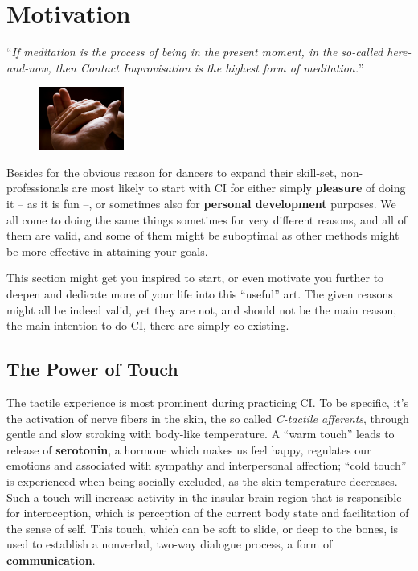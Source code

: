 \chapter{Motivation}\label{ch:motivation}

\begin{displayquote}
    ``\textit{If meditation is the process of being in the present moment, in the so-called here-and-now, then Contact Improvisation is the highest form of meditation.}''
\end{displayquote}

\begin{figure}
    \centering
    \includegraphics[width=0.25\textwidth]{images/motivation}
\end{figure}

Besides for the obvious reason for dancers to expand their skill-set, non-professionals are most likely to start with CI for either simply \textbf{pleasure} of doing it -- as it is fun --, or sometimes also for \textbf{personal development} purposes.
We all come to doing the same things sometimes for very different reasons, and all of them are valid, and some of them might be suboptimal as other methods might be more effective in attaining your goals.

This section might get you inspired to start, or even motivate you further to deepen and dedicate more of your life into this ``useful'' art.
The given reasons might all be indeed valid, yet they are not, and should not be the main reason, the main intention to do CI, there are simply co-existing.

\section{The Power of Touch}\label{sec:the-power-of-touch}

The tactile experience is most prominent during practicing CI. To be specific, it's the activation of nerve fibers in the skin, the so called \textit{C-tactile afferents}, through gentle and slow stroking with body-like temperature.
A ``warm touch'' leads to release of \textbf{serotonin}, a hormone which makes us feel happy, regulates our emotions and associated with sympathy and interpersonal affection; ``cold touch'' is experienced when being socially excluded, as the skin temperature decreases.
Such a touch will increase activity in the insular brain region that is responsible for interoception, which is perception of the current body state and facilitation of the sense of self.
This touch, which can be soft to slide, or deep to the bones, is used to establish a nonverbal, two-way dialogue process, a form of \textbf{communication}.

